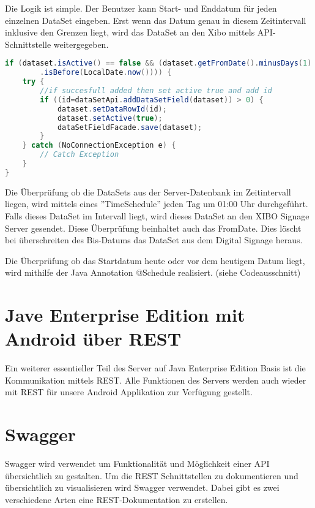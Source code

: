 Die Logik ist simple. Der Benutzer kann Start- und Enddatum für jeden einzelnen DataSet eingeben. Erst wenn das Datum genau in diesem Zeitintervall inklusive den Grenzen liegt, wird das DataSet an den Xibo mittels API-Schnittstelle weitergegeben. 

\begin{lstlisting}[language=Java, caption={public void doCheckEvery24Hours()}]
if (dataset.isActive() == false && (dataset.getFromDate().minusDays(1)
        .isBefore(LocalDate.now()))) {
    try {
        //if succesfull added then set active true and add id
        if ((id=dataSetApi.addDataSetField(dataset)) > 0) {
            dataset.setDataRowId(id);
            dataset.setActive(true);
            dataSetFieldFacade.save(dataset);
        }
    } catch (NoConnectionException e) {
        // Catch Exception
    }
}
\end{lstlisting}

Die Überprüfung ob die DataSets aus der Server-Datenbank im Zeitintervall liegen, wird mittels eines ''TimeSchedule'' jeden Tag um 01:00 Uhr durchgeführt. Falls dieses DataSet im Intervall liegt, wird dieses DataSet an den XIBO Signage Server gesendet. Diese Überprüfung beinhaltet auch das FromDate. Dies löscht bei überschreiten des Bis-Datums das DataSet aus dem Digital Signage heraus. 

Die Überprüfung ob das Startdatum heute oder vor dem heutigem Datum liegt, wird mithilfe der Java Annotation @Schedule realisiert. (siehe Codeausschnitt) 

\section{Jave Enterprise Edition mit Android über REST}\label{sec:javaeeandroidrest}
Ein weiterer essentieller Teil des Server auf Java Enterprise Edition Basis ist die Kommunikation mittels REST. Alle Funktionen des Servers werden auch wieder mit REST für unsere Android Applikation zur Verfügung gestellt. 

\section{Swagger}\label{sec:javaeeandroidrestswagger}
Swagger wird verwendet um Funktionalität und Möglichkeit einer API übersichtlich zu gestalten. Um die REST Schnittstellen zu dokumentieren und übersichtlich zu visualisieren wird Swagger verwendet. Dabei gibt es zwei verschiedene Arten eine REST-Dokumentation zu erstellen. 

